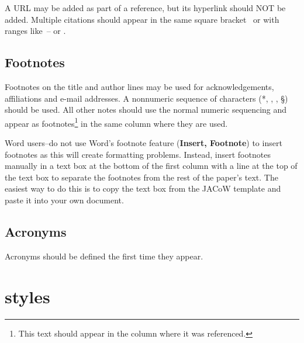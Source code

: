 \documentclass[a4paper]{jacow}
\begin{document}
A URL may be added as part of a reference, but
its hyperlink should NOT be added. Multiple citations should appear in
the same square bracket~\cite{exampl-ref2, exampl-ref3} or
with ranges like~\cite{exampl-ref2}--\cite{exampl-ref3} or \cite{exampl-ref2, jacow-help, exampl-ref, exampl-ref2, exampl-ref3}.

\subsection{Footnotes}

Footnotes on the title and author lines may be used for acknowledgements,
affiliations and e-mail addresses. A nonnumeric sequence of characters (*,
\dag, \ddag, \S) should be used. All other notes should use the normal numeric
sequencing and appear as footnotes\footnote{This text should appear
in the column where it was referenced.} in the same column where they are used.

Word users--do not use Word's footnote feature (\textbf{Insert, Footnote})
to insert footnotes as this will create formatting problems. Instead, insert
footnotes manually in a text box at the bottom of the first column with a
line at the top of the text box to separate the footnotes from the rest of
the paper's text.  The easiest way to do this is to copy the text box from
the JACoW template and paste it into your own document.

\subsection{Acronyms}

Acronyms should be defined the first time they appear.

\section{styles}
\end{document}
